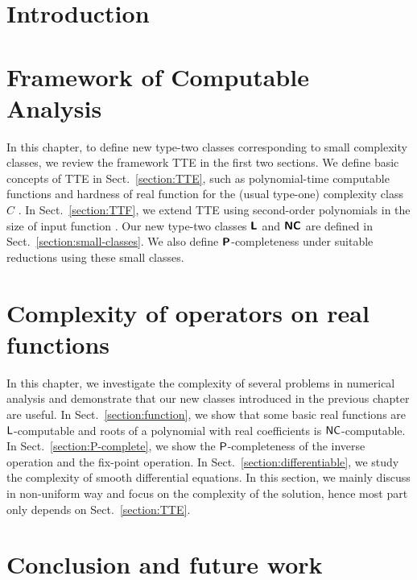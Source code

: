 \documentclass[master,final]{iscs-thesis}
\date{\today}
\theoremstyle{definition}
\theoremstyle{remark}
\begin{document}

\maketitle

\frontmatter
\tableofcontents
\mainmatter
\chapter{Introduction}


\chapter{Framework of Computable Analysis}
\label{chapter:computable-analysis}
In this chapter,
to define new type-two classes corresponding to small complexity classes,
we review the framework TTE in the first two sections.
We define basic concepts of TTE in Sect.~\ref{section:TTE},
such as polynomial-time computable functions and hardness of real function
for the (usual type-one) complexity class $C$ \cite{ko1991complexity}.
In Sect.~\ref{section:TTF}, we extend TTE using second-order polynomials
in the size of input function \cite{kawamura2012complexity}.
Our new type-two classes $\text{\bfseries \sffamily \upshape L}$ and $\text{\bfseries \sffamily \upshape NC}$ are defined in Sect.~\ref{section:small-classes}.
We also define $\text{\bfseries \sffamily \upshape P}$-completeness under suitable reductions using these small classes.





\chapter{Complexity of operators on real functions}
\label{chapter:applications}
In this chapter, we investigate the complexity of several problems in numerical
analysis and demonstrate that our new classes introduced in the previous
chapter are useful.
In Sect.~\ref{section:function}, 
we show that some basic real functions are $\mathsf{L}$-computable and
roots of a polynomial with real coefficients is $\mathsf{NC}$-computable.
In Sect.~\ref{section:P-complete}, we show the $\mathsf{P}$-completeness of 
the inverse operation and the fix-point operation.
In Sect.~\ref{section:differentiable}, we study the complexity of
smooth differential equations.
In this section, we mainly discuss in non-uniform way and focus on the 
complexity of the solution,
hence most part only depends on Sect.~\ref{section:TTE}.





\chapter{Conclusion and future work}
\label{chapter:conclusion}




\end{document}

